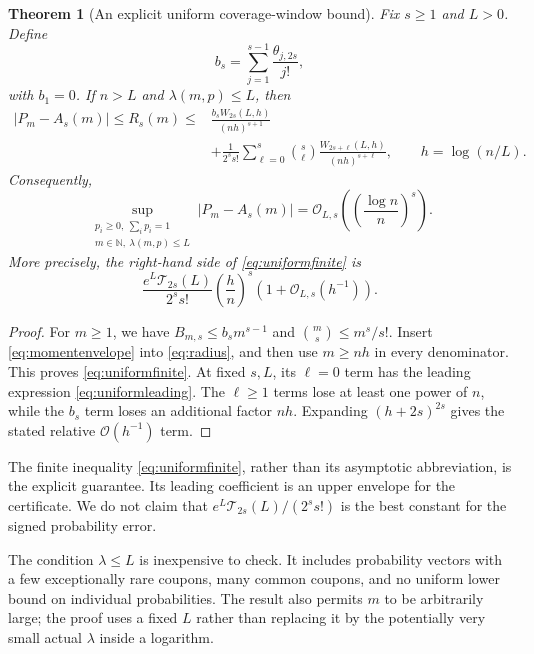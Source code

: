 \documentclass[11pt,a4paper]{article}
\newtheorem{theorem}{Theorem}[section]
\theoremstyle{definition}
\newcommand{\N}{\mathbb N}
\newcommand{\bigO}{\mathcal O}
\begin{document}
\begin{theorem}[An explicit uniform coverage-window bound]\label{thm:uniform}
Fix $s\ge1$ and $L>0$. Define
\[
 b_s=\sum_{j=1}^{s-1}\frac{\theta_{j,2s}}{j!},
\]
with $b_1=0$. If $n>L$ and $\lambda(m,p)\le L$, then
\begin{equation}\label{eq:uniformfinite}
\begin{split}
 |P_m-A_s(m)|\le R_s(m)\le {}&
 \frac{b_s W_{2s}(L,h)}{(nh)^{s+1}}\\
 &+\frac1{2^s s!}\sum_{\ell=0}^s\binom s\ell
       \frac{W_{2s+\ell}(L,h)}{(nh)^{s+\ell}},
 \qquad h=\log(n/L).
\end{split}
\end{equation}
Consequently,
\begin{equation}\label{eq:uniformrate}
 \sup_{\substack{p_i\ge0,\ \sum_i p_i=1\\
                  m\in\N,\ \lambda(m,p)\le L}}
 |P_m-A_s(m)|
 =\bigO_{L,s}\!\left(\left(\frac{\log n}{n}\right)^s\right).
\end{equation}
More precisely, the right-hand side of \eqref{eq:uniformfinite} is
\begin{equation}\label{eq:uniformleading}
 \frac{e^L\mathcal T_{2s}(L)}{2^s s!}
 \left(\frac{h}{n}\right)^s
 \left(1+\bigO_{L,s}(h^{-1})\right).
\end{equation}
\end{theorem}
\begin{proof}
For $m\ge1$, we have
$B_{m,s}\le b_s m^{s-1}$ and $\binom ms\le m^s/s!$.
Insert \eqref{eq:momentenvelope} into \eqref{eq:radius}, and then use
$m\ge nh$ in every denominator. This proves
\eqref{eq:uniformfinite}. At fixed $s,L$, its $\ell=0$ term has the
leading expression \eqref{eq:uniformleading}. The $\ell\ge1$ terms
lose at least one power of $n$, while the $b_s$ term loses an additional
factor $nh$. Expanding $(h+2s)^{2s}$ gives the stated relative
$\bigO(h^{-1})$ term.
\end{proof}

The finite inequality \eqref{eq:uniformfinite}, rather than its
asymptotic abbreviation, is the explicit guarantee. Its leading
coefficient is an upper envelope for the certificate. We do not claim
that $e^L\mathcal T_{2s}(L)/(2^s s!)$ is the best constant for the
signed probability error.

The condition $\lambda\le L$ is inexpensive to check. It includes
probability vectors with a few exceptionally rare coupons, many common
coupons, and no uniform lower bound on individual probabilities. The
result also permits $m$ to be arbitrarily large; the proof uses a fixed
$L$ rather than replacing it by the potentially very small actual
$\lambda$ inside a logarithm.
\end{document}
